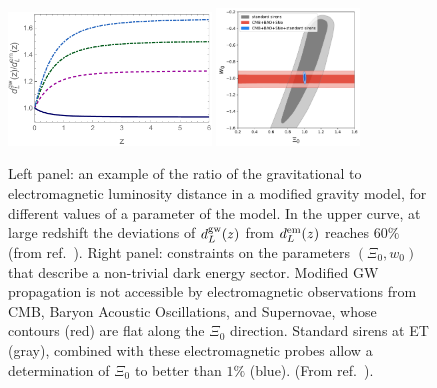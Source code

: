 \begin{figure}[t]
\includegraphics[width=0.48\textwidth]{Figures/dgw_su_dem.pdf}\quad\quad
\includegraphics[width=0.34\textwidth]{Figures/xi0_w0.pdf}
\caption{Left panel: an example of the ratio of the gravitational to electromagnetic luminosity distance in a modified gravity model, for different values of a parameter of the model. In the upper curve, at large redshift  the deviations of $d_L^{\rm gw}(z)$ from $d_L^{\rm em}(z)$ reaches $60\%$ (from 
ref.~\cite{Belgacem:2019lwx}). Right panel: constraints on the parameters $(\Xi_0,w_0)$  that describe a non-trivial dark energy sector. Modified GW propagation is not accessible by electromagnetic observations from CMB, Baryon Acoustic Oscillations,  and Supernovae, whose contours (red) are flat along the $\Xi_0$ direction. Standard sirens at ET (gray), combined with these electromagnetic probes  allow a determination of $\Xi_0$ 
 to better than $1\%$ (blue). (From ref.~\cite{Belgacem:2018lbp}).
\label{fig:xi0w0}}
\end{figure}


